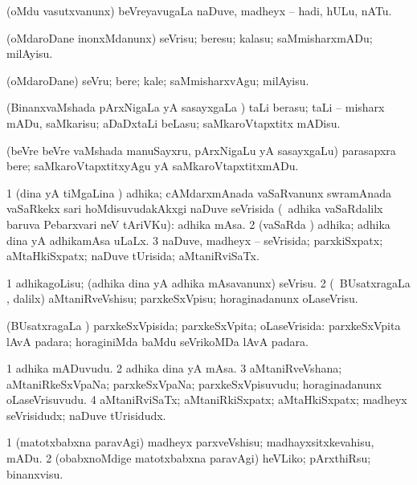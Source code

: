\bentry
{}
\gl{\sakirx}
\bmng
(oMdu vasutxvanunx) beVreyavugaLa naDuve, madheyx -- hadi, hULu, nATu. 
\emng
\eentry

\bentry
{}
\gl{\sakirx}
\bmng
(oMdaroDane inonxMdanunx) seVrisu; beresu; kalasu; saMmisharxmADu; milAyisu. 
\emng

\noindent
\gl{\akirx}
\bmng
(oMdaroDane) seVru; bere; kale; saMmisharxvAgu; milAyisu. 
\emng
\eentry

\bentry
{}
\gl{\kirx}
\bmng
 \sakirx (BinanxvaMshada pArxNigaLa yA sasayxgaLa \vi) taLi berasu; taLi -- misharx mADu, saMkarisu; aDaDxtaLi beLasu; saMkaroVtapxtitx mADisu. 
\emng

\noindent 
\gl{\akirx}
\bmng
(beVre beVre vaMshada manuSayxru, pArxNigaLu yA sasayxgaLu) parasapxra bere; saMkaroVtapxtitxyAgu yA saMkaroVtapxtitxmADu. 
\emng
\eentry

\bentry
{}
\gl{\gu}
\bmng
\bnum
\num{1} (dina yA tiMgaLina \vi) adhika; cAMdarxmAnada vaSaRvanunx swramAnada vaSaRkekx sari hoMdisuvudakAkxgi naDuve seVrisida (\udA\ adhika vaSaRdalilx baruva Pebarxvari neV tAriVKu):  adhika mAsa. 
\num{2} (vaSaRda \vi) adhika; adhika dina yA adhikamAsa uLaLx. 
\num{3} naDuve, madheyx -- seVrisida; parxkiSxpatx; aMtaHkiSxpatx; naDuve tUrisida; aMtaniRviSaTx. 
\enum
\emng
\eentry

\bentry
{}
\gl{\sakirx}
\bmng
\bnum
\num{1} adhikagoLisu; (adhika dina yA adhika mAsavanunx) seVrisu. 
\num{2} (\kanmu\ BUsatxragaLa \vi, \BUkaq dalilx) aMtaniRveVshisu; parxkeSxVpisu; horaginadanunx oLaseVrisu. 
\enum
\emng
\eentry

\bentry
{}
\gl{\gu}
\bmng
(BUsatxragaLa \vi) parxkeSxVpisida; parxkeSxVpita; oLaseVrisida:  parxkeSxVpita lAvA padara; horaginiMda baMdu seVrikoMDa lAvA padara. 
\emng
\eentry

\bentry
{}
\gl{\nA}
\bmng
\bnum
\num{1} adhika mADuvudu. 
\num{2} adhika dina yA mAsa. 
\num{3} aMtaniRveVshana; aMtaniRkeSxVpaNa; parxkeSxVpaNa; parxkeSxVpisuvudu; horaginadanunx oLaseVrisuvudu. 
\num{4} aMtaniRviSaTx; aMtaniRkiSxpatx; aMtaHkiSxpatx; madheyx seVrisidudx; naDuve tUrisidudx. 
\enum
\emng
\eentry

\bentry
{}
\gl{\akirx}
\bmng
\bnum
\num{1} (matotxbabxna paravAgi) madheyx parxveVshisu; madhayxsitxkevahisu, mADu. 
\num{2} (obabxnoMdige matotxbabxna paravAgi) heVLiko; pArxthiRsu; binanxvisu. 
\enum
\emng
\eentry

